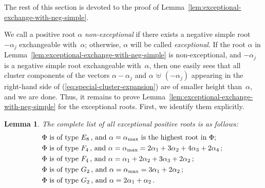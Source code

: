 \documentclass[letterpaper]{amsart}
\numberwithin{equation}{section}
\newtheorem{lemma}[theorem]{Lemma}
\theoremstyle{definition}
\def\subplus{{\,\uplus\,} }
\begin{document}
The rest of this section is devoted to the proof of 
Lemma~\ref{lem:exceptional-exchange-with-neg-simple}. 
 
 
We call a positive root $\alpha$ \emph{non-exceptional} if there exists 
a negative simple root $-\alpha_j$ exchangeable with~$\alpha$; 
otherwise, $\alpha$ will be called \emph{exceptional}. 
If the root $\alpha$ in Lemma~\ref{lem:exceptional-exchange-with-neg-simple} 
is non-exceptional, and $-\alpha_j$ is a negative simple root 
exchangeable with~$\alpha$, then one easily sees that all cluster 
components of the vectors $\alpha-\alpha_j$ and $\alpha\subplus (-\alpha_j)$ 
appearing in the right-hand side of (\ref{eq:special-cluster-expansion}) 
are of smaller height than~$\alpha$, and we are done. 
Thus, it remains to prove 
Lemma~\ref{lem:exceptional-exchange-with-neg-simple} for the 
exceptional roots. First, we identify them explicitly. 
 
\begin{lemma} 
\label{lem:every-root-except-some} 
The complete list of all exceptional positive roots is as follows: 
\begin{align} 
\label{eq:E8-exceptional} 
&\text{$\Phi$ is of type~$E_8\,$, and $\alpha=\alpha_{\rm max}$ is the 
highest root in~$\Phi$;} 
\\ 
\label{eq:F4-exceptional-1} 
&\text{$\Phi$ is of type~$F_4\,$, and 
  $\alpha=\alpha_{\rm max}=2\alpha_1+3\alpha_2+4\alpha_3+2\alpha_4\,$; 
} 
\\ 
\label{eq:F4-exceptional-2} 
&\text{$\Phi$ is of type~$F_4\,$, %
and 
  $\alpha=\alpha_1+2\alpha_2+3\alpha_3+2\alpha_2\,$;} 
\\ 
\label{eq:G2-exceptional-1} 
&\text{$\Phi$ is of type~$G_2\,$, and 
  $\alpha=\alpha_{\rm max}=3\alpha_1+2\alpha_2\,$;} 
\\ 
\label{eq:G2-exceptional-2} 
&\text{$\Phi$ is of type~$G_2\,$, %
and 
$\alpha=2\alpha_1+\alpha_2\,$.} 
\end{align} 
\end{lemma} 
 
\end{document}
